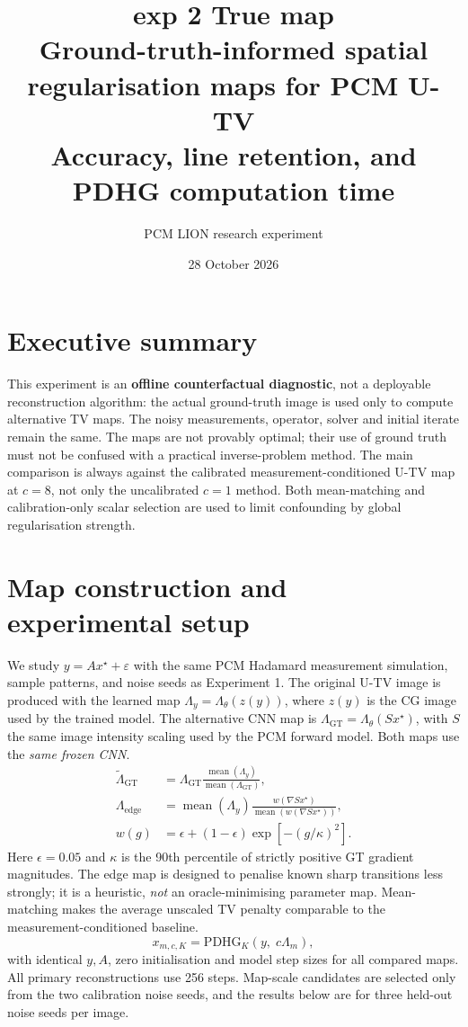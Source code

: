\documentclass[11pt,a4paper]{article}
\title{\textbf{exp 2 True map}\\[4pt]\large Ground-truth-informed spatial regularisation maps for PCM U-TV\\ Accuracy, line retention, and PDHG computation time}
\author{PCM LION research experiment}
\date{28 October 2026}
\begin{document}
\maketitle\tableofcontents\clearpage
\section{Executive summary}
This experiment is an \textbf{offline counterfactual diagnostic}, not a deployable reconstruction algorithm: the actual ground-truth image is used only to compute alternative TV maps. The noisy measurements, operator, solver and initial iterate remain the same. The maps are not provably optimal; their use of ground truth must not be confused with a practical inverse-problem method.
The main comparison is always against the calibrated measurement-conditioned U-TV map at $c=8$, not only the uncalibrated $c=1$ method. Both mean-matching and calibration-only scalar selection are used to limit confounding by global regularisation strength.
\section{Map construction and experimental setup}
We study $y=Ax^\star+\varepsilon$ with the same PCM Hadamard measurement simulation, sample patterns, and noise seeds as Experiment 1. The original U-TV image is produced with the learned map $\Lambda_y=\Lambda_\theta(z(y))$, where $z(y)$ is the CG image used by the trained model. The alternative CNN map is $\Lambda_{\mathrm{GT}}=\Lambda_\theta(Sx^\star)$, with $S$ the same image intensity scaling used by the PCM forward model. Both maps use the \emph{same frozen CNN}.
\begin{align*}
\widetilde\Lambda_{\mathrm{GT}}&=\Lambda_{\mathrm{GT}}\frac{\operatorname{mean}(\Lambda_y)}{\operatorname{mean}(\Lambda_{\mathrm{GT}})},\\
\Lambda_{\mathrm{edge}}&=\operatorname{mean}(\Lambda_y)\frac{w(\nabla Sx^\star)}{\operatorname{mean}(w(\nabla Sx^\star))},\\
w(g)&=\epsilon+(1-\epsilon)\exp[-(g/\kappa)^2].
\end{align*}
Here $\epsilon=0.05$ and $\kappa$ is the 90th percentile of strictly positive GT gradient magnitudes. The edge map is designed to penalise known sharp transitions less strongly; it is a heuristic, \emph{not} an oracle-minimising parameter map. Mean-matching makes the average unscaled TV penalty comparable to the measurement-conditioned baseline.
\begin{equation*}
x_{m,c,K}=\mathrm{PDHG}_{K}\!\left(y,\;c\Lambda_m\right),
\end{equation*}
with identical $y,A$, zero initialisation and model step sizes for all compared maps. All primary reconstructions use 256 steps. Map-scale candidates are selected only from the two calibration noise seeds, and the results below are for three held-out noise seeds per image.
\end{document}
